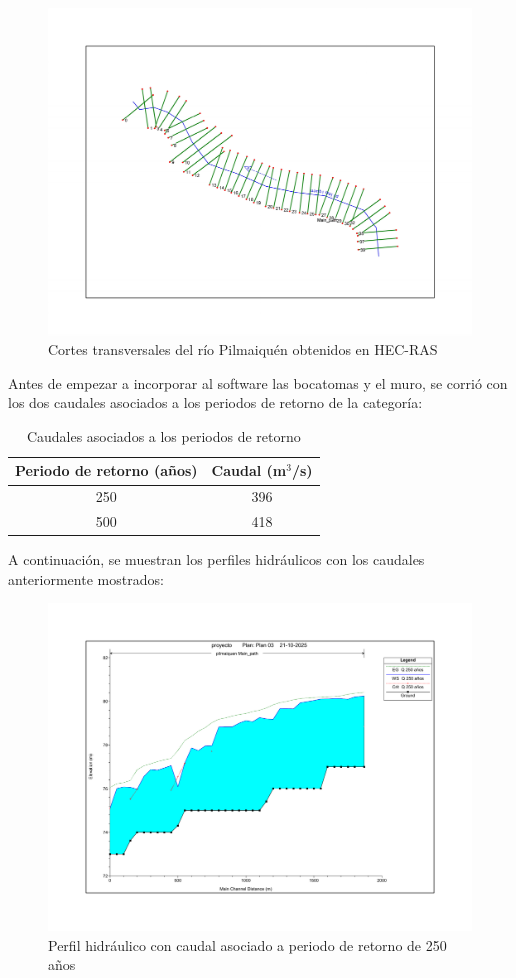 \documentclass{article} %
\begin{document}
\begin{figure}[h!]
    \centering
    \includegraphics[width=0.6\linewidth]{imagenes/rio_sin_estruc.pdf}
    \caption{Cortes transversales del río Pilmaiquén obtenidos en HEC-RAS}
\end{figure}

Antes de empezar a incorporar al software las bocatomas y el muro, se corrió con los dos caudales asociados a los periodos de retorno de la categoría:

\begin{table}[h]
    \centering
    \begin{tabular}{c c}
        \textbf{Periodo de retorno (años)} & \textbf{Caudal (m$^3$/s)} \\
        \hline
        250 & 396 \\ 
        500 & 418 \\\hline
    \end{tabular}
    \caption{Caudales asociados a los periodos de retorno}
\end{table}

A continuación, se muestran los perfiles hidráulicos con los caudales anteriormente mostrados:

\begin{figure}[H]
    \centering
    \includegraphics[width=0.6\linewidth]{imagenes/perfil_250_sb.pdf}
    \caption{Perfil hidráulico con caudal asociado a periodo de retorno de 250 años}
\end{figure}
\end{document}

